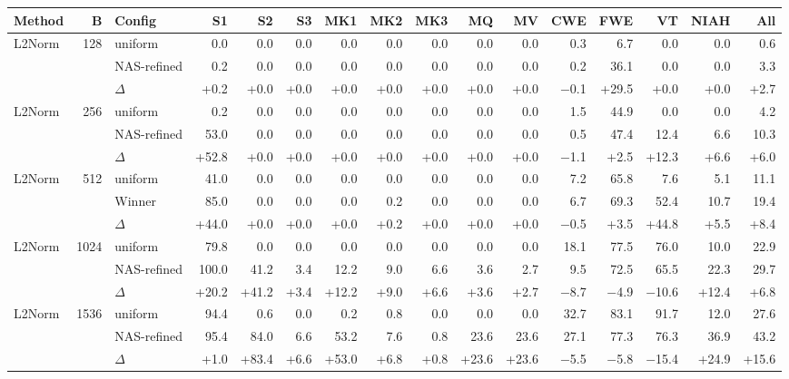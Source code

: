 \begin{table}[tp]
  \centering
  \scriptsize
  \setlength{\tabcolsep}{2.5pt}
  \begin{tabular}{@{}l r l r r r r r r r r r r r r r @{}}
    \toprule
    Method & B & Config & S1 & S2 & S3 & MK1 & MK2 & MK3 & MQ & MV & CWE & FWE & VT & NIAH & All \\
    \midrule
    L2Norm & 128 & uniform & 0.0 & 0.0 & 0.0 & 0.0 & 0.0 & 0.0 & 0.0 & 0.0 & 0.3 & 6.7 & 0.0 & 0.0 & 0.6 \\
     &  & NAS-refined & 0.2 & 0.0 & 0.0 & 0.0 & 0.0 & 0.0 & 0.0 & 0.0 & 0.2 & 36.1 & 0.0 & 0.0 & 3.3 \\
     &  & $\Delta$ & +0.2 & +0.0 & +0.0 & +0.0 & +0.0 & +0.0 & +0.0 & +0.0 & $-$0.1 & +29.5 & +0.0 & +0.0 & +2.7 \\
    \midrule
    L2Norm & 256 & uniform & 0.2 & 0.0 & 0.0 & 0.0 & 0.0 & 0.0 & 0.0 & 0.0 & 1.5 & 44.9 & 0.0 & 0.0 & 4.2 \\
     &  & NAS-refined & 53.0 & 0.0 & 0.0 & 0.0 & 0.0 & 0.0 & 0.0 & 0.0 & 0.5 & 47.4 & 12.4 & 6.6 & 10.3 \\
     &  & $\Delta$ & +52.8 & +0.0 & +0.0 & +0.0 & +0.0 & +0.0 & +0.0 & +0.0 & $-$1.1 & +2.5 & +12.3 & +6.6 & +6.0 \\
    \midrule
    L2Norm & 512 & uniform & 41.0 & 0.0 & 0.0 & 0.0 & 0.0 & 0.0 & 0.0 & 0.0 & 7.2 & 65.8 & 7.6 & 5.1 & 11.1 \\
     &  & Winner & 85.0 & 0.0 & 0.0 & 0.0 & 0.2 & 0.0 & 0.0 & 0.0 & 6.7 & 69.3 & 52.4 & 10.7 & 19.4 \\
     &  & $\Delta$ & +44.0 & +0.0 & +0.0 & +0.0 & +0.2 & +0.0 & +0.0 & +0.0 & $-$0.5 & +3.5 & +44.8 & +5.5 & +8.4 \\
    \midrule
    L2Norm & 1024 & uniform & 79.8 & 0.0 & 0.0 & 0.0 & 0.0 & 0.0 & 0.0 & 0.0 & 18.1 & 77.5 & 76.0 & 10.0 & 22.9 \\
     &  & NAS-refined & 100.0 & 41.2 & 3.4 & 12.2 & 9.0 & 6.6 & 3.6 & 2.7 & 9.5 & 72.5 & 65.5 & 22.3 & 29.7 \\
     &  & $\Delta$ & +20.2 & +41.2 & +3.4 & +12.2 & +9.0 & +6.6 & +3.6 & +2.7 & $-$8.7 & $-$4.9 & $-$10.6 & +12.4 & +6.8 \\
    \midrule
    L2Norm & 1536 & uniform & 94.4 & 0.6 & 0.0 & 0.2 & 0.8 & 0.0 & 0.0 & 0.0 & 32.7 & 83.1 & 91.7 & 12.0 & 27.6 \\
     &  & NAS-refined & 95.4 & 84.0 & 6.6 & 53.2 & 7.6 & 0.8 & 23.6 & 23.6 & 27.1 & 77.3 & 76.3 & 36.9 & 43.2 \\
     &  & $\Delta$ & +1.0 & +83.4 & +6.6 & +53.0 & +6.8 & +0.8 & +23.6 & +23.6 & $-$5.5 & $-$5.8 & $-$15.4 & +24.9 & +15.6 \\

\end{tabular}
\end{table}
